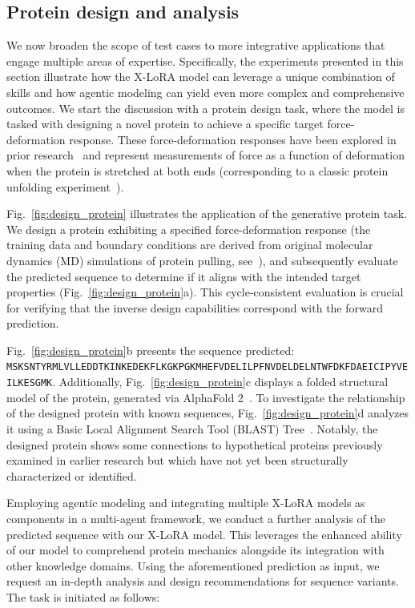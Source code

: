\subsection{Protein design and analysis}

We now broaden the scope of test cases to more integrative applications that engage multiple areas of expertise. Specifically, the experiments presented in this section illustrate how the X-LoRA model can leverage a unique combination of skills and how agentic modeling can yield even more complex and comprehensive outcomes. We start the discussion with a protein design task, where the model is tasked with designing a novel protein to achieve a specific target force-deformation response. These force-deformation responses have been explored in prior research~\cite{Ni2023ForceGen:Model} and represent measurements of force as a function of deformation when the protein is stretched at both ends (corresponding to a classic protein unfolding experiment~\cite{Lu1998UnfoldingSimulation.}).

Fig.~\ref{fig:design_protein} illustrates the application of the generative protein task. We design a protein exhibiting a specified force-deformation response (the training data and boundary conditions are derived from original molecular dynamics (MD) simulations of protein pulling, see~\cite{Ni2023ForceGen:Model}), and subsequently evaluate the predicted sequence to determine if it aligns with the intended target properties (Fig.~\ref{fig:design_protein}a). This cycle-consistent evaluation is crucial for verifying that the inverse design capabilities correspond with the forward prediction.

Fig.~\ref{fig:design_protein}b presents the sequence predicted: \texttt{MSKSNTYRMLVLLEDDTKINKEDEKFLKGKPGKMHEFVDELILPFNVDELDELNTWFDKFDAEICIPYVEILKESGMK}. Additionally, Fig.~\ref{fig:design_protein}c displays a folded structural model of the protein, generated via AlphaFold 2~\cite{Jumper2021HighlyAlphaFoldb}. To investigate the relationship of the designed protein with known sequences, Fig.~\ref{fig:design_protein}d analyzes it using a Basic Local Alignment Search Tool (BLAST) Tree~\cite{Altschul1990BasicTool}. Notably, the designed protein shows some connections to hypothetical proteins previously examined in earlier research but which have not yet been structurally characterized or identified.

Employing agentic modeling and integrating multiple X-LoRA models as components in a multi-agent framework, we conduct a further analysis of the predicted sequence with our X-LoRA model. This leverages the enhanced ability of our model to comprehend protein mechanics alongside its integration with other knowledge domains. Using the aforementioned prediction as input, we request an in-depth analysis and design recommendations for sequence variants. The task is initiated as follows:

